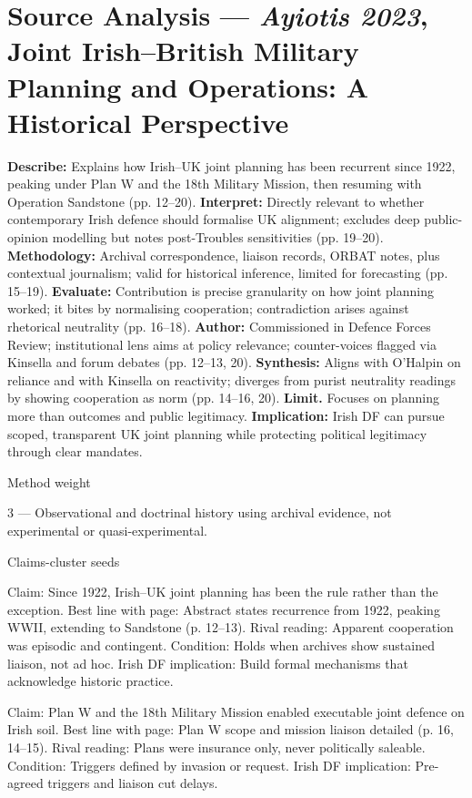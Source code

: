 \section*{Source Analysis — \textit{Ayiotis 2023}, Joint Irish–British Military Planning and Operations: A Historical Perspective}
\textbf{Describe:} Explains how Irish–UK joint planning has been recurrent since 1922, peaking under Plan W and the 18th Military Mission, then resuming with Operation Sandstone (pp. 12–20).
\textbf{Interpret:} Directly relevant to whether contemporary Irish defence should formalise UK alignment; excludes deep public-opinion modelling but notes post-Troubles sensitivities (pp. 19–20).
\textbf{Methodology:} Archival correspondence, liaison records, ORBAT notes, plus contextual journalism; valid for historical inference, limited for forecasting (pp. 15–19).
\textbf{Evaluate:} Contribution is precise granularity on how joint planning worked; it bites by normalising cooperation; contradiction arises against rhetorical neutrality (pp. 16–18).
\textbf{Author:} Commissioned in Defence Forces Review; institutional lens aims at policy relevance; counter-voices flagged via Kinsella and forum debates (pp. 12–13, 20).
\textbf{Synthesis:} Aligns with O’Halpin on reliance and with Kinsella on reactivity; diverges from purist neutrality readings by showing cooperation as norm (pp. 14–16, 20).
\textbf{Limit.} Focuses on planning more than outcomes and public legitimacy.
\textbf{Implication:} Irish DF can pursue scoped, transparent UK joint planning while protecting political legitimacy through clear mandates.

Method weight

3 — Observational and doctrinal history using archival evidence, not experimental or quasi-experimental.

Claims-cluster seeds

Claim: Since 1922, Irish–UK joint planning has been the rule rather than the exception.
Best line with page: Abstract states recurrence from 1922, peaking WWII, extending to Sandstone (p. 12–13).
Rival reading: Apparent cooperation was episodic and contingent.
Condition: Holds when archives show sustained liaison, not ad hoc.
Irish DF implication: Build formal mechanisms that acknowledge historic practice.

Claim: Plan W and the 18th Military Mission enabled executable joint defence on Irish soil.
Best line with page: Plan W scope and mission liaison detailed (p. 16, 14–15).
Rival reading: Plans were insurance only, never politically saleable.
Condition: Triggers defined by invasion or request.
Irish DF implication: Pre-agreed triggers and liaison cut delays.

